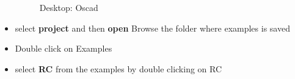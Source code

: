 \begin{itemize}
\begin{figure}[h]
\caption{Desktop: Oscad }
\label{Terminal: Oscad}
\end{figure}
\newpage
\item select \textbf{project} and then \textbf{open}
Browse the folder where examples is saved
\item Double click on Examples
\item select \textbf{RC} from the examples by double clicking on RC

\end{itemize}




